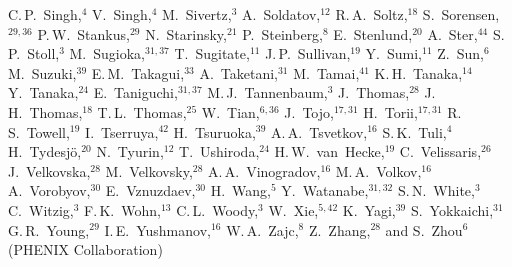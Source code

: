 {C.{\,}P.~Singh,$^{4}$
V.~Singh,$^{4}$
M.~Sivertz,$^{3}$
A.~Soldatov,$^{12}$
R.{\,}A.~Soltz,$^{18}$
S.~Sorensen,$^{29,36}$
P.{\,}W.~Stankus,$^{29}$
N.~Starinsky,$^{21}$
P.~Steinberg,$^{8}$
E.~Stenlund,$^{20}$
A.~Ster,$^{44}$
S.{\,}P.~Stoll,$^{3}$
M.~Sugioka,$^{31,37}$
T.~Sugitate,$^{11}$
J.{\,}P.~Sullivan,$^{19}$
Y.~Sumi,$^{11}$
Z.~Sun,$^{6}$
M.~Suzuki,$^{39}$
E.{\,}M.~Takagui,$^{33}$
A.~Taketani,$^{31}$
M.~Tamai,$^{41}$
K.{\,}H.~Tanaka,$^{14}$
Y.~Tanaka,$^{24}$
E.~Taniguchi,$^{31,37}$
M.{\,}J.~Tannenbaum,$^{3}$
J.~Thomas,$^{28}$
J.{\,}H.~Thomas,$^{18}$
T.{\,}L.~Thomas,$^{25}$
W.~Tian,$^{6,36}$
J.~Tojo,$^{17,31}$
H.~Torii,$^{17,31}$
R.{\,}S.~Towell,$^{19}$
I.~Tserruya,$^{42}$
H.~Tsuruoka,$^{39}$
A.{\,}A.~Tsvetkov,$^{16}$
S.{\,}K.~Tuli,$^{4}$
H.~Tydesj{\"o},$^{20}$
N.~Tyurin,$^{12}$
T.~Ushiroda,$^{24}$
H.{\,}W.~van~Hecke,$^{19}$
C.~Velissaris,$^{26}$
J.~Velkovska,$^{28}$
M.~Velkovsky,$^{28}$
A.{\,}A.~Vinogradov,$^{16}$
M.{\,}A.~Volkov,$^{16}$
A.~Vorobyov,$^{30}$
E.~Vznuzdaev,$^{30}$
H.~Wang,$^{5}$
Y.~Watanabe,$^{31,32}$
S.{\,}N.~White,$^{3}$
C.~Witzig,$^{3}$
F.{\,}K.~Wohn,$^{13}$
C.{\,}L.~Woody,$^{3}$
W.~Xie,$^{5,42}$
K.~Yagi,$^{39}$
S.~Yokkaichi,$^{31}$
G.{\,}R.~Young,$^{29}$
I.{\,}E.~Yushmanov,$^{16}$
W.{\,}A.~Zajc,$^{8}$
Z.~Zhang,$^{28}$
and S.~Zhou$^{6}$
\\(PHENIX Collaboration)\\
}
